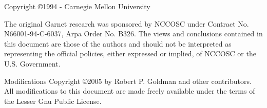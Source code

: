 \begin{center}
Copyright \copyright{1994} - Carnegie Mellon University
\end{center}

The original Garnet research
was sponsored by NCCOSC under Contract No.
N66001-94-C-6037, Arpa Order No. B326.
The views and conclusions contained in this document are those of
the authors and should not be interpreted as representing the
official policies, either expressed or implied, of NCCOSC or the U.S.
Government.

Modifications Copyright \copyright{2005} by Robert P. Goldman and other
contributors.  All modifications to this document are made freely
available under the terms of the Lesser Gnu Public License.


